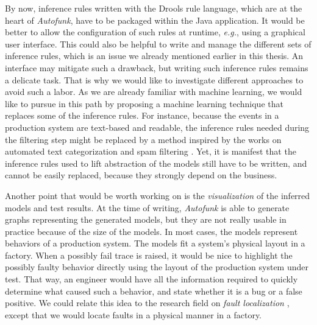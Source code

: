 By now, inference rules written with the Drools rule language,
which are at the heart of \emph{Autofunk}, have to be packaged
within the Java application. It would be better to allow the
configuration of such rules at runtime, \emph{e.g.}, using a
graphical user interface. This could also be helpful to write and
manage the different sets of inference rules, which is an issue
we already mentioned earlier in this thesis. An interface may
mitigate such a drawback, but writing such inference rules
remains a delicate task. That is why we would like to investigate
different approaches to avoid such a labor. As we are already
familiar with machine learning, we would like to pursue in this
path by proposing a machine learning technique that replaces some
of the inference rules. For instance, because the events in a
production system are text-based and readable, the inference
rules needed during the filtering step might be replaced by a
method inspired by the works on automated text categorization
\cite{Sebastiani:2002:MLA:505282.505283} and spam filtering
\cite{Guzella200910206}. Yet, it is manifest that the inference
rules used to lift abstraction of the models still have to be
written, and cannot be easily replaced, because they strongly
depend on the business.

Another point that would be worth working on is the
\emph{visualization} of the inferred models and test results. At
the time of writing, \emph{Autofunk} is able to generate graphs
representing the generated models, but they are not really usable
in practice because of the size of the models. In most cases, the
models represent behaviors of a production system. The models fit a system's
physical layout in a factory. When a possibly fail trace is
raised, it would be nice to highlight the possibly faulty
behavior directly using the layout of the production system under
test. That way, an engineer would have all the information
required to quickly determine what caused such a behavior, and
state whether it is a bug or a false positive. We could relate
this idea to the research field on \emph{fault localization}
\cite{jones2002visualization,wong2010software}, except that we
would locate faults in a physical manner in a factory.

